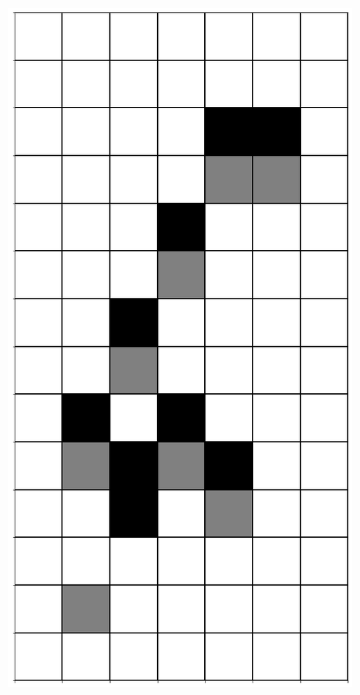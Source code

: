 \documentclass[12pt]{article}
\numberwithin{figure}{section} %
\begin{document}
\begin{figure}[H]
\begin{subfigure}{0.3\textwidth}
     		\subcaption{}
   	\end{subfigure}
     	\begin{subfigure}{0.3\textwidth}
     		\centering
     		\includegraphics[angle=270,width=\linewidth]{Section4/12.1}
     		\subcaption{}
   	\end{subfigure}

\end{figure}
\end{document}
